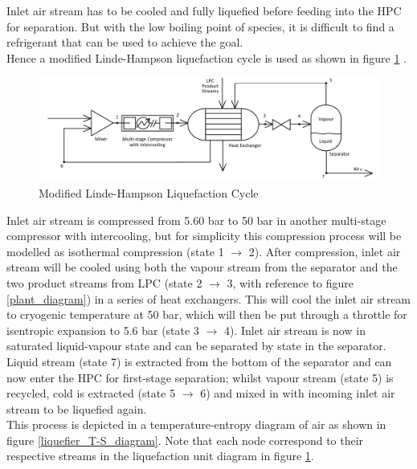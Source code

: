         Inlet air stream has to be cooled and fully liquefied before feeding into the HPC for separation. But with the low boiling point of species, it is difficult to find a refrigerant that can be used to achieve the goal. \\
        Hence a modified Linde-Hampson liquefaction cycle is used as shown in figure \ref{labelled_liquefier_diagram} \citep{barron1985}. \\
        \begin{figure}[H]
            \centering
            \includegraphics[scale=0.4]{labelled_liquefier_diagram.jpg}
            \caption{Modified Linde-Hampson Liquefaction Cycle}
            \label{labelled_liquefier_diagram}
        \end{figure}
        \noindent Inlet air stream is compressed from 5.60 bar to 50 bar in another multi-stage compressor with intercooling, but for simplicity this compression process will be modelled as isothermal compression (state 1 $\rightarrow$ 2). After compression, inlet air stream will be cooled using both the vapour stream from the separator and the two product streams from LPC (state 2 $\rightarrow$ 3, with reference to figure \ref{plant_diagram}) in a series of heat exchangers. This will cool the inlet air stream to cryogenic temperature at 50 bar, which will then be put through a throttle for isentropic expansion to 5.6 bar (state 3 $\rightarrow$ 4). Inlet air stream is now in saturated liquid-vapour state and can be separated by state in the separator. Liquid stream (state 7) is extracted from the bottom of the separator and can now enter the HPC for first-stage separation; whilst vapour stream (state 5) is recycled, cold is extracted (state 5 $\rightarrow$ 6) and mixed in with incoming inlet air stream to be liquefied again. \\
        This process is depicted in a temperature-entropy diagram of air as shown in figure \ref{liquefier_T-S_diagram}. Note that each node correspond to their respective streams in the liquefaction unit diagram in figure \ref{labelled_liquefier_diagram}. \\
